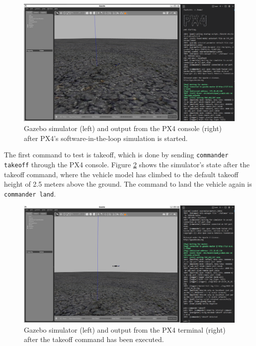 \begin{figure}[H]
  \centering
  \includegraphics[width=\textwidth, keepaspectratio]{img/gazebo.png}
  \caption{Gazebo simulator (left) and output from the PX4 console (right) after PX4's software-in-the-loop simulation is started.}
  \label{fig:gazebo}
\end{figure}

The first command to test is takeoff, which is done by sending \texttt{commander takeoff} through the PX4 console.
Figure \ref{fig:gazebo-takeoff} shows the simulator's state after the takeoff command, where the vehicle model has climbed to the default takeoff height of 2.5 meters above the ground.
The command to land the vehicle again is \texttt{commander land}.

\begin{figure}
  \centering
  \includegraphics[width=\textwidth, keepaspectratio]{img/gazebo-takeoff.png}
  \caption{Gazebo simulator (left) and output from the PX4 terminal (right) after the takeoff command has been executed.}
  \label{fig:gazebo-takeoff}
\end{figure}


